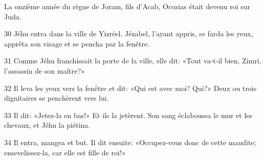 La onzième année du règne de Joram, fils d’Acab, Ocozias était devenu roi sur Juda.

30 Jéhu entra dans la ville de Yizréel. Jézabel, l’ayant appris, se farda les yeux, apprêta son visage et se pencha par la fenêtre.

31 Comme Jéhu franchissait la porte de la ville, elle dit: «Tout va-t-il bien, Zimri, l’assassin de son maître?»

32 Il leva les yeux vers la fenêtre et dit: «Qui est avec moi? Qui?» Deux ou trois dignitaires se penchèrent vers lui.

33 Il dit: «Jetez-la en bas!» Et ils la jetèrent. Son sang éclaboussa le mur et les chevaux, et Jéhu la piétina.

34 Il entra, mangea et but. Il dit ensuite: «Occupez-vous donc de cette maudite; ensevelissez-la, car elle est fille de roi!»
